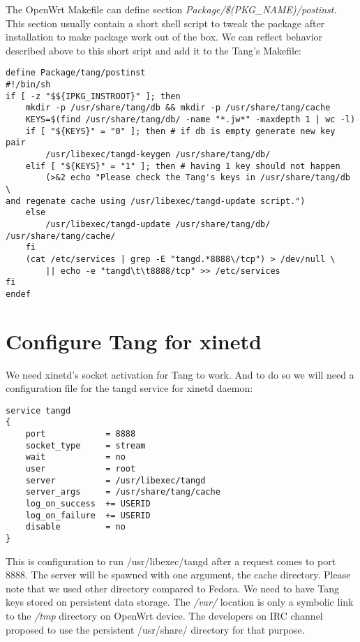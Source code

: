 The OpenWrt Makefile can define section {\it Package/\$(PKG\_NAME)/postinst}.
This section usually contain a short shell script to tweak the package after installation to make package work out of the box.
We can reflect behavior described above to this short sript and add it to the Tang's Makefile:
\begin{lstlisting}[columns=fixed,basicstyle=\ttfamily\footnotesize,tabsize=4,backgroundcolor=\color{yellow!10}]
define Package/tang/postinst
#!/bin/sh
if [ -z "$${IPKG_INSTROOT}" ]; then
	mkdir -p /usr/share/tang/db && mkdir -p /usr/share/tang/cache
	KEYS=$(find /usr/share/tang/db/ -name "*.jw*" -maxdepth 1 | wc -l)
	if [ "${KEYS}" = "0" ]; then # if db is empty generate new key pair
		/usr/libexec/tangd-keygen /usr/share/tang/db/
	elif [ "${KEYS}" = "1" ]; then # having 1 key should not happen
		(>&2 echo "Please check the Tang's keys in /usr/share/tang/db \
and regenate cache using /usr/libexec/tangd-update script.")
	else
		/usr/libexec/tangd-update /usr/share/tang/db/ /usr/share/tang/cache/
	fi
	(cat /etc/services | grep -E "tangd.*8888\/tcp") > /dev/null \
		|| echo -e "tangd\t\t8888/tcp" >> /etc/services
fi
endef
\end{lstlisting}



\section{Configure Tang for xinetd}

We need xinetd's socket activation for Tang to work.
And to do so we will need a configuration file for the tangd service for xinetd daemon:
\begin{lstlisting}[columns=fixed,basicstyle=\ttfamily\footnotesize,tabsize=4,backgroundcolor=\color{yellow!10},caption=Configuration of Tang service for xinetd]
service tangd
{
    port            = 8888
    socket_type     = stream
    wait            = no
    user            = root
    server          = /usr/libexec/tangd
    server_args     = /usr/share/tang/cache
    log_on_success  += USERID
    log_on_failure  += USERID
    disable         = no
}
\end{lstlisting}
This is configuration to run /usr/libexec/tangd after a request comes to port 8888.
The server will be spawned with one argument, the cache directory.
Please note that we used other directory compared to Fedora.
We need to have Tang keys stored on persistent data storage.
The {\it /var/} location is only a symbolic link to the {\it /tmp} directory on OpenWrt device.
The developers on IRC channel proposed to use the persistent /usr/share/ directory for that purpose.

